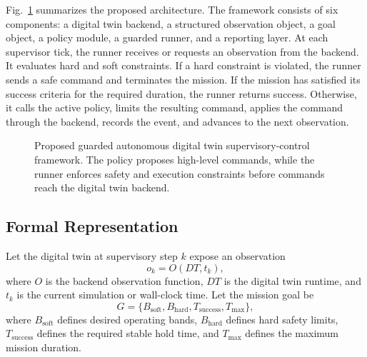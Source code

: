 \documentclass[conference]{IEEEtran}
\begin{document}
Fig.~\ref{fig:architecture} summarizes the proposed architecture. The
framework consists of six components: a digital twin backend, a structured
observation object, a goal object, a policy module, a guarded runner, and a
reporting layer. At each supervisor tick, the runner receives or requests an
observation from the backend. It evaluates hard and soft constraints. If a
hard constraint is violated, the runner sends a safe command and terminates
the mission. If the mission has satisfied its success criteria for the
required duration, the runner returns success. Otherwise, it calls the active
policy, limits the resulting command, applies the command through the backend,
records the event, and advances to the next observation.

\begin{figure}[t]
\centering
{}
\caption{Proposed guarded autonomous digital twin supervisory-control framework.
The policy proposes high-level commands, while the runner enforces safety and
execution constraints before commands reach the digital twin backend.}
\label{fig:architecture}
\end{figure}

\subsection{Formal Representation}

Let the digital twin at supervisory step $k$ expose an observation
\begin{equation}
    o_k = O(DT, t_k),
\end{equation}
where $O$ is the backend observation function, $DT$ is the digital twin
runtime, and $t_k$ is the current simulation or wall-clock time. Let the
mission goal be
\begin{equation}
    G = \{B_{\mathrm{soft}}, B_{\mathrm{hard}}, T_{\mathrm{success}}, T_{\max}\},
\end{equation}
where $B_{\mathrm{soft}}$ defines desired operating bands,
$B_{\mathrm{hard}}$ defines hard safety limits, $T_{\mathrm{success}}$
defines the required stable hold time, and $T_{\max}$ defines the maximum
mission duration.
\end{document}
